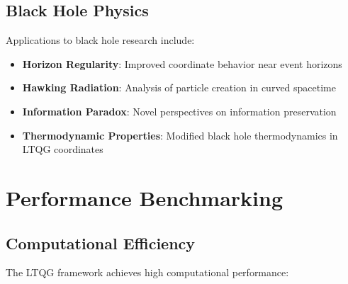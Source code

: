 \documentclass[11pt,a4paper]{article}
\theoremstyle{definition}
\theoremstyle{remark}
\begin{document}
\subsection{Black Hole Physics}

Applications to black hole research include:

\begin{itemize}
\item \textbf{Horizon Regularity}: Improved coordinate behavior near event horizons
\item \textbf{Hawking Radiation}: Analysis of particle creation in curved spacetime
\item \textbf{Information Paradox}: Novel perspectives on information preservation
\item \textbf{Thermodynamic Properties}: Modified black hole thermodynamics in LTQG coordinates
\end{itemize}

\section{Performance Benchmarking}

\subsection{Computational Efficiency}

The LTQG framework achieves high computational performance:
\end{document}
